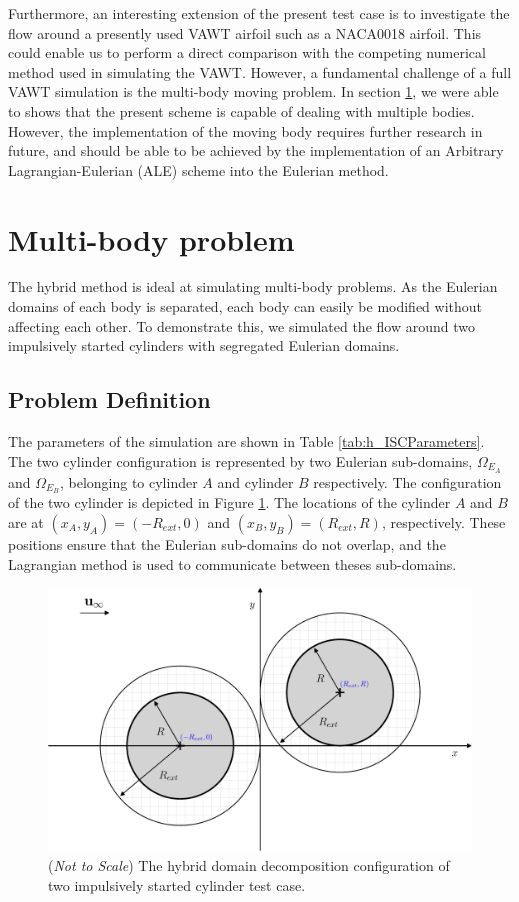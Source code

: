 Furthermore, an interesting extension of the present test case is to investigate the flow around a presently used VAWT airfoil such as a NACA0018 airfoil. This could enable us to perform a direct comparison with the competing numerical method used in simulating the VAWT. However, a fundamental challenge of a full VAWT simulation is the multi-body moving problem. In section \ref{sec:vvhm-mb}, we were able to shows that the present scheme is capable of dealing with multiple bodies. However, the implementation of the moving body requires further research in future, and should be able to be achieved by the implementation of an Arbitrary Lagrangian-Eulerian (ALE) scheme into the Eulerian method.

	
\section{Multi-body problem}
\label{sec:vvhm-mb}

The hybrid method is ideal at simulating multi-body problems. As the Eulerian domains of each body is separated, each body can easily be modified without affecting each other. To demonstrate this, we simulated the flow around two impulsively started cylinders with segregated Eulerian domains. 

\subsection{Problem Definition}

The parameters of the simulation are shown in Table \ref{tab:h_ISCParameters}. The two cylinder configuration is represented by two Eulerian sub-domains, $\Omega_{E_{A}}$ and $\Omega_{E_B}$, belonging to cylinder $A$ and cylinder $B$ respectively. The configuration of the two cylinder is depicted in Figure \ref{fig:hmisc_dd-crop}. The locations of the cylinder $A$ and $B$ are at $(x_A,y_A) = (-R_{ext},0)$ and $(x_B,y_B) = (R_{ext},R)$, respectively. These positions ensure that the Eulerian sub-domains do not overlap, and the Lagrangian method is used to communicate between theses sub-domains.

	\begin{figure}[!h]
	\centering
	\includegraphics[width=0.6\linewidth]{./figures/validation/multipleCylinder/hmisc_dd-crop.pdf}
	\caption{(\textit{Not to Scale}) The hybrid domain decomposition configuration of two impulsively started cylinder test case. }
	\label{fig:hmisc_dd-crop}
	\end{figure}

